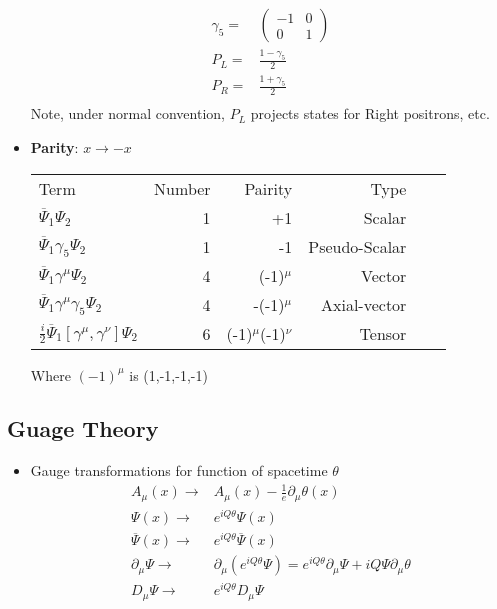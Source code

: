 \begin{itemize}
\begin{equation}
\begin{split}
    \gamma_5=&\begin{pmatrix}-1&0\\0&1\end{pmatrix} \\
    P_L=&\frac{1-\gamma_5}{2} \\
    P_R=&\frac{1+\gamma_5}{2} \\
    \end{split} \end{equation}
    Note, under normal convention, $P_L$ projects states for Right positrons, etc.
    \item \textbf{Parity}: $x\to-x$ \\ \cite{wells}
        \begin{center}
        \begin{tabular}{l r r r r r}\toprule
        Term                    & Number & Pairity & Type \\
        $\overline{\Psi}_1\Psi_2$ & 1 & +1 & Scalar \\
        $\overline{\Psi}_1\gamma_5\Psi_2$ & 1 & -1 & Pseudo-Scalar \\
        $\overline{\Psi}_1\gamma^\mu\Psi_2$ & 4 & (-1)$^\mu$ & Vector \\
        $\overline{\Psi}_1\gamma^\mu\gamma_5\Psi_2$ & 4 & -(-1)$^\mu$ & Axial-vector \\
        $\frac{i}{2}\overline{\Psi}_1[\gamma^\mu,\gamma^\nu]\Psi_2$ & 6 & (-1)$^\mu$(-1)$^\nu$ & Tensor \\
        \bottomrule\end{tabular} %
        \end{center}
        Where $(-1)^\mu$ is (1,-1,-1,-1)
\end{itemize}

\subsection{Guage Theory}
\begin{itemize}
    \item Gauge transformations for function of spacetime $\theta$ \cite{wells}
    \begin{equation}\begin{split}
        A_\mu(x)\to&A_\mu(x)-\frac{1}{e}\partial_\mu\theta(x)\\
        \Psi(x)\to&e^{iQ\theta}\Psi(x) \\
        \overline{\Psi}(x)\to&e^{iQ\theta}\overline{\Psi}(x) \\
        \partial_\mu\Psi\to&\partial_\mu(e^{iQ\theta}\Psi)=e^{iQ\theta}\partial_\mu\Psi+iQ\Psi\partial_\mu\theta \\
        D_\mu\Psi\to&e^{iQ\theta}D_\mu\Psi \\
    \end{split}\end{equation}
\end{itemize}


